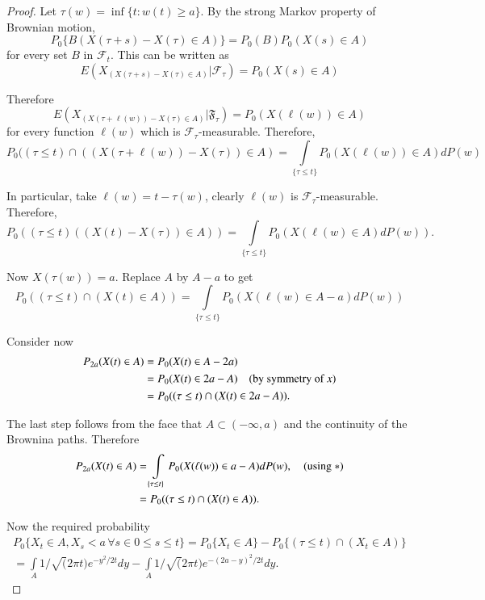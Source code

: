 \begin{proof}
Let $\tau(w)=\inf\{t:w(t)\geq a\}$. By the strong Markov property of
Brownian motion,
$$
P_{0}\{B(X(\tau+s)-X(\tau)\in A)\}=P_{0}(B)P_{0}(X(s)\in A)
$$
for every set $B$ in $\mathscr{F}_{t}$. This can be written as
$$
E(X_{(X(\tau+s)-X(\tau)\in A)}|\mathscr{F}_{\tau})=P_{0}(X(s)\in A)
$$

Therefore\pageoriginale
$$
E(X_{(X(\tau+\ell(w))-X(\tau)\in
  A)}|\mathfrak{F}_{\tau})=P_{0}(X(\ell(w))\in A)
$$
for every function $\ell(w)$ which is
$\mathscr{F}_{\tau}$-measurable. Therefore,
$$
P_{0}((\tau\leq t)\cap ((X(\tau+\ell(w))-X(\tau))\in
A)=\int\limits_{\{\tau\leq t\}}P_{0}(X(\ell(w))\in A)dP(w)
$$

In particular, take $\ell(w)=t-\tau(w)$, clearly $\ell(w)$ is
$\mathscr{F}_{\tau}$-measurable. Therefore,
$$
P_{0}((\tau\leq t)((X(t)-X(\tau))\in A))=\int\limits_{\{\tau\leq
  t\}}P_{0}(X(\ell(w)\in A)dP(w)).
$$

Now $X(\tau(w))=a$. Replace $A$ by $A-a$ to get
\begin{equation*}
P_{0}((\tau\leq t)\cap (X(t)\in A))=\int\limits_{\{\tau\leq
  t\}}P_{0}(X(\ell(w)\in A-a)dP(w))\tag{*}
\end{equation*}

Consider now
\begin{align*}
P_{2a}(X(t)\in A) &= P_{0}(X(t)\in A-2a)\\
&= P_{0}(X(t)\in 2a-A)\quad\text{(by symmetry of $x$)}\\
&= P_{0}((\tau\leq t)\cap (X(t)\in 2a-A)).
\end{align*}

The last step follows from the face that $A\subset (-\infty,a)$ and
the continuity of the Brownina paths. Therefore 
\begin{align*}
P_{2a}(X(t)\in A) &= \int\limits_{\{\tau\leq t\}}P_{0}(X(\ell(w))\in
a-A)dP(w),\quad (\text{using~ } *)\\
&= P_{0}((\tau\leq t)\cap (X(t)\in A)).
\end{align*}

Now the required probability
\begin{gather*}
P_{0}\{X_{t}\in A,X_{s}<a\,\forall s\in 0\leq s\leq t\}=P_{0}\{X_{t}\in
A\}-P_{0}\{(\tau\leq t)\cap (X_{t}\in A)\}\\
=\int\limits_{A}1/\surd(2\pi
t)e^{-y^{2}/2t}dy-\int\limits_{A}1/\surd(2\pi t)e^{-(2a-y)^{2}/2t}dy.
\end{gather*}


\end{proof}
